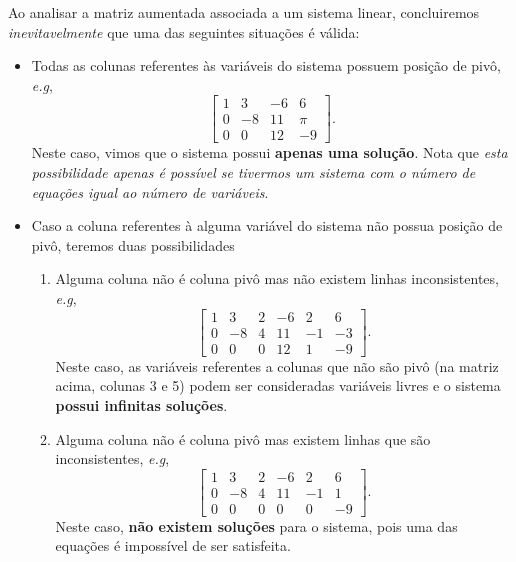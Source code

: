 \documentclass[../livro.tex]{subfiles} %
\begin{document}
Ao analisar a matriz aumentada associada a um sistema linear, concluiremos \textit{inevitavelmente} que uma das seguintes situações é válida:
\begin{itemize}
  \item Todas as colunas referentes às variáveis do sistema possuem posição de pivô, \emph{e.g},
\begin{equation}
\left[
  \begin{array}{ccc|c}
    1 &  3 & -6 &  6  \\
    0 & -8 & 11 & \pi  \\
    0 & 0 & 12 & -9
  \end{array}
\right].
\end{equation} Neste caso, vimos que o sistema possui \textbf{apenas uma solução}. Nota que \textit{esta possibilidade apenas é possível se tivermos um sistema com o número de equações igual ao número de variáveis}.
  \item Caso a coluna referentes à alguma variável do sistema não possua posição de pivô, teremos duas possibilidades
\begin{enumerate}[$(i)$]
  \item Alguma coluna não é coluna pivô mas não existem linhas inconsistentes, \emph{e.g},
\begin{equation}
\left[
  \begin{array}{ccccc|c}
    1 & 3  & 2  & -6 & 2  &  6  \\
    0 & -8 & 4 & 11  & -1  & -3  \\
    0 & 0  &  0 & 12 &  1 & -9
  \end{array}
\right].
\end{equation} Neste caso, as variáveis referentes a colunas que não são pivô (na matriz acima, colunas 3 e 5) podem ser consideradas variáveis livres e o sistema \textbf{possui infinitas soluções}.

  \item Alguma coluna não é coluna pivô mas existem linhas que são inconsistentes, \emph{e.g},
\begin{equation}
\left[
  \begin{array}{ccccc|c}
    1 & 3  & 2  & -6 & 2  &  6  \\
    0 & -8 & 4 & 11  & -1  & 1  \\
    0 & 0  &  0 & 0 &  0 & -9
  \end{array}
\right].
\end{equation} Neste caso, \textbf{não existem soluções} para o sistema, pois uma das equações é impossível de ser satisfeita.
\end{enumerate}
\end{itemize}
\end{document}
